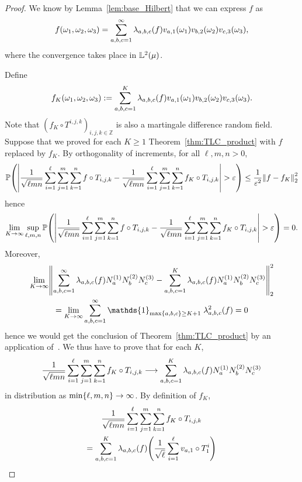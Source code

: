 \documentclass[10pt]{amsart}
\theoremstyle{definition}\newtheorem{defi}[theo]{Definition}\newtheorem{rema}[theo]{Remark}\newtheorem{exam}[theo]{Example}\newtheorem{exem}[theo]{Example}\newtheorem{nota}[theo]{Notation}
\newcommand{\Z}{\mathbb{Z}}
\newcommand*\bbL{\mathbb{L}}
\newcommand{\PP}{\mathbb{P}}
\newcommand{\pr}[1]{\left(#1\right)}
\newcommand{\norm}[1]{\left\lVert #1\right\rVert}
\newcommand{\abs}[1]{\left\lvert #1\right\rvert}
\newcommand{\ens}[1]{\left\{#1\right\}}
\renewcommand*{\to}{\mathchoice{\longrightarrow}{\rightarrow}{\rightarrow}{\rightarrow}}
\let\originalleft\left
\let\originalright\right
\renewcommand{\left}{\mathopen{}\mathclose\bgroup\originalleft}
\renewcommand{\right}{\aftergroup\egroup\originalright}
\begin{document}
\begin{proof}
We know by Lemma~\ref{lem:base_Hilbert} that we can express $f$ as
\[
f(\omega_1,\omega_2,\omega_3)=\sum_{a,b,c=1}^\infty
\lambda_{a,b,c}\pr{f}
v_{a,1}\pr{\omega_1}v_{b,2}\pr{\omega_2}v_{c,3}\pr{\omega_3},
\]
where the convergence takes place in $\bbL^2\pr{\mu}$.

Define
\begin{equation*}
f_K\pr{\omega_1,\omega_2,\omega_3}:=\sum_{a,b,c=1}^K
\lambda_{a,b,c}\pr{f} v_{a,1}\pr{\omega_1}v_{b,2}\pr{\omega_2}v_{c,3}\pr{\omega_3}.
\end{equation*}
Note that $(f_K\circ T^{i,j,k})_{i,j,k\in\Z}$ is also a martingale difference random field. Suppose that we proved for each $K\geq 1$ Theorem~\ref{thm:TLC_product} with $f$ replaced by $f_K$. By orthogonality of increments, for all $\ell, m, n>0$,
\[
\PP\pr{\abs{\frac1{\sqrt{\ell mn}}\sum_{i=1}^\ell\sum_{j=1}^m\sum_{k=1}^n f\circ T_{i,j,k}-\frac1{\sqrt{\ell mn}}\sum_{i=1}^\ell\sum_{j=1}^m\sum_{k=1}^n f_K\circ T_{i,j,k}}>\varepsilon}
\leq\frac 1{\varepsilon^2}\norm{f-f_K}_2^2
\]
hence
\[
\lim_{K\to\infty}\sup_{\ell,m,n}
\PP\pr{\abs{\frac1{\sqrt{\ell mn}}\sum_{i=1}^\ell\sum_{j=1}^m\sum_{k=1}^n f\circ T_{i,j,k}-\frac1{\sqrt{\ell mn}}\sum_{i=1}^\ell\sum_{j=1}^m\sum_{k=1}^n f_K\circ T_{i,j,k}}>\varepsilon}=0.
\]
Moreover,
\begin{multline*}
\lim_{K\to\infty}\norm{\sum_{a,b,c=1}^\infty \lambda_{a,b,c}\pr{f} N_a^{\pr{1}}N_b^{\pr{2}}N_c^{\pr{3}}-\sum_{a,b,c=1}^K
\lambda_{a,b,c}\pr{f} N_a^{\pr{1}}N_b^{\pr{2}}N_c^{\pr{3}}}_2^2\\ =
\lim_{K\to\infty} \sum_{a,b,c=1}^\infty
\mathds{1}_{\max\ens{a,b,c}\geq K+1 }\;
\lambda_{a,b,c}^2\pr{f}=0
\end{multline*}
hence we would get the conclusion of Theorem~\ref{thm:TLC_product} by an application of~\cite[Theorem~4.2]{MR233396}. We thus have to prove that for each $K$,
\begin{equation}\label{eq:tlc_produit_somme_de_K_elements}
\frac1{\sqrt{\ell mn}}\sum_{i=1}^\ell\sum_{j=1}^m\sum_{k=1}^n f_K\circ T_{i,j,k}\to \sum_{a,b,c=1}^K\lambda_{a,b,c}\pr{f} N_a^{\pr{1}}N_b^{\pr{2}}N_c^{\pr{3}}
\end{equation}
in distribution as $\min\{\ell,m,n\}\to\infty$. By definition of $f_K$,
\begin{multline*}
\frac1{\sqrt{\ell mn}}\sum_{i=1}^\ell\sum_{j=1}^m\sum_{k=1}^n f_K\circ T_{i,j,k}\\
=\sum_{a,b,c=1}^K\lambda_{a,b,c}\pr{f}
\pr{\frac 1{\sqrt{\ell}}\sum_{i=1}^\ell v_{a,1}\circ T_1^i}

\end{multline*}
\end{proof}
\end{document}
